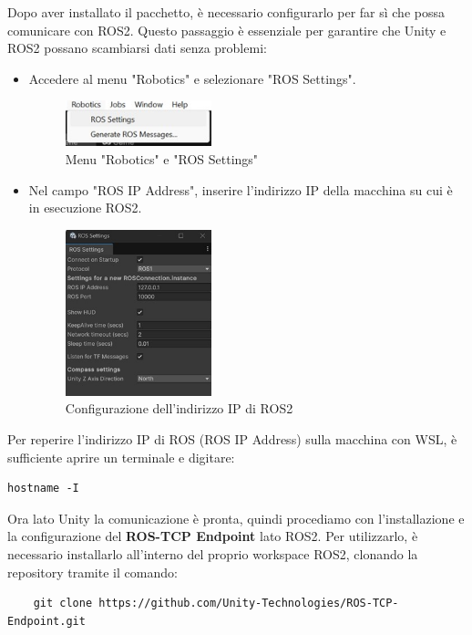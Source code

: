 \documentclass[11pt]{report}
\begin{document}
Dopo aver installato il pacchetto, è necessario configurarlo per far sì che possa comunicare con ROS2. Questo passaggio è essenziale per garantire che Unity e ROS2 possano scambiarsi dati senza problemi:


\begin{itemize}
    \item Accedere al menu "Robotics" e selezionare "ROS Settings".
    \begin{figure}[H]
        \centering
        \includegraphics[width=0.4\textwidth]{images/rostcp2.jpg}
        \caption{Menu "Robotics" e "ROS Settings"}
        \label{fig:rostcp2}
    \end{figure}
    
    \item Nel campo "ROS IP Address", inserire l'indirizzo IP della macchina su cui è in esecuzione ROS2.
    \begin{figure}[H]
        \centering
        \includegraphics[width=0.4\textwidth]{images/rostcp4.jpg}
        \caption{Configurazione dell'indirizzo IP di ROS2}
        \label{fig:rostcp4}
    \end{figure}
\end{itemize}

Per reperire l'indirizzo IP di ROS (ROS IP Address) sulla macchina con WSL, è sufficiente aprire un terminale e digitare:

\begin{verbatim}
hostname -I
\end{verbatim}

Ora lato Unity la comunicazione è pronta, quindi procediamo con l'installazione e la configurazione del \textbf{ROS-TCP Endpoint} lato ROS2.
Per utilizzarlo, è necessario installarlo all'interno del proprio workspace ROS2, clonando la repository tramite il comando: \cite{Repository-ROS-TCP-Endpoint}
\begin{verbatim}
    git clone https://github.com/Unity-Technologies/ROS-TCP-Endpoint.git
\end{verbatim}
\end{document}
